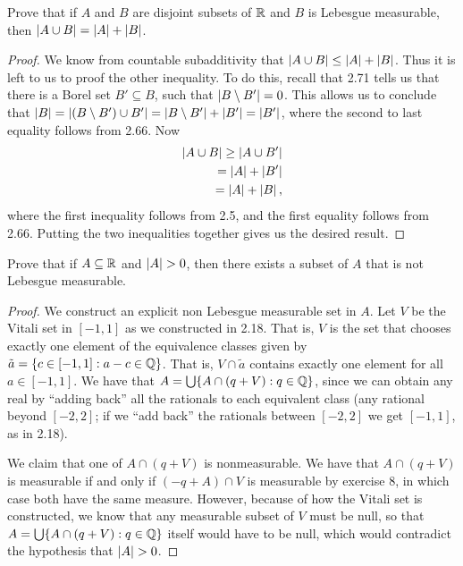 \begin{exercise}{10}
Prove that if $A$ and $B$ are disjoint subsets of $\mathbb{R}$ and $B$ is Lebesgue measurable, then $\left\lvert A \cup B\right\rvert = \left\lvert A\right\rvert + \left\lvert B\right\rvert$.
\end{exercise}
\begin{proof}
We know from countable subadditivity that $\left\lvert A \cup B\right\rvert \leq \left\lvert A\right\rvert + \left\lvert B\right\rvert$.
Thus it is left to us to proof the other inequality.
To do this, recall that 2.71 tells us that there is a Borel set $B' \subseteq B$, such that $\left\lvert B \setminus B'\right\rvert = 0$.
This allows us to conclude that $\left\lvert B\right\rvert = \left\lvert (B \setminus B') \cup B'\right\rvert = \left\lvert B \setminus B'\right\rvert + \left\lvert B'\right\rvert = \left\lvert B'\right\rvert$, where the second to last equality follows from 2.66.
Now
\begin{align*}
    \left\lvert A \cup B\right\rvert
    \geq \left\lvert A \cup B'\right\rvert\\
    = \left\lvert A\right\rvert + \left\lvert B'\right\rvert\\
    = \left\lvert A\right\rvert + \left\lvert B\right\rvert,
\end{align*}
where the first inequality follows from 2.5, and the first equality follows from 2.66.
Putting the two inequalities together gives us the desired result.
\end{proof} 

\begin{exercise}{11}
Prove that if $A \subseteq \mathbb{R}$ and $\left\lvert A\right\rvert > 0$, then there exists a subset of $A$ that is not Lebesgue measurable.
\end{exercise}
\begin{proof}
We construct an explicit non Lebesgue measurable set in $A$.
Let $V$ be the Vitali set in $[-1,1]$ as we constructed in 2.18.
That is, $V$ is the set that chooses exactly one element of the equivalence classes given by $\tilde{a} = \{c \in [-1,1]: a-c \in \mathbb{Q}\}$.
That is, $V \cap\tilde{a}$ contains exactly one element for all $a \in [-1,1]$.
We have that $A = \bigcup \{A \cap (q+V): q\in\mathbb{Q}\}$, since we can obtain any real by ``adding back'' all the rationals to each equivalent class (any rational beyond $[-2,2]$;
if we ``add back'' the rationals between $[-2,2]$ we get $[-1,1]$, as in 2.18).

We claim that one of $A \cap (q+V)$ is nonmeasurable.
We have that $A \cap (q+V)$ is measurable if and only if $(-q+A) \cap V$ is measurable by exercise 8, in which case both have the same measure.
However, because of how the Vitali set is constructed, we know that any measurable subset of $V$ must be null, so that $A = \bigcup \{A \cap (q+V): q\in\mathbb{Q}\}$ itself would have to be null, which would contradict the hypothesis that $\left\lvert A\right\rvert > 0$.
\end{proof} 

